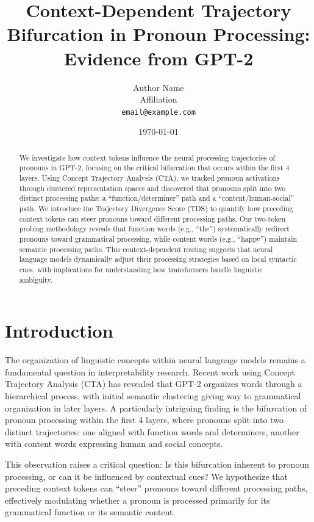 \documentclass[11pt]{article}
\title{Context-Dependent Trajectory Bifurcation in Pronoun Processing: Evidence from GPT-2}
\author{
  Author Name \\
  Affiliation \\
  \texttt{email@example.com}
}
\date{\today}
\begin{document}
\maketitle

\begin{abstract}
We investigate how context tokens influence the neural processing trajectories of pronouns in GPT-2, focusing on the critical bifurcation that occurs within the first 4 layers. Using Concept Trajectory Analysis (CTA), we tracked pronoun activations through clustered representation spaces and discovered that pronouns split into two distinct processing paths: a ``function/determiner'' path and a ``content/human-social'' path. We introduce the Trajectory Divergence Score (TDS) to quantify how preceding context tokens can steer pronouns toward different processing paths. Our two-token probing methodology reveals that function words (e.g., ``the'') systematically redirect pronouns toward grammatical processing, while content words (e.g., ``happy'') maintain semantic processing paths. This context-dependent routing suggests that neural language models dynamically adjust their processing strategies based on local syntactic cues, with implications for understanding how transformers handle linguistic ambiguity.
\end{abstract}

\section{Introduction}

The organization of linguistic concepts within neural language models remains a fundamental question in interpretability research. Recent work using Concept Trajectory Analysis (CTA) has revealed that GPT-2 organizes words through a hierarchical process, with initial semantic clustering giving way to grammatical organization in later layers. A particularly intriguing finding is the bifurcation of pronoun processing within the first 4 layers, where pronouns split into two distinct trajectories: one aligned with function words and determiners, another with content words expressing human and social concepts.

This observation raises a critical question: Is this bifurcation inherent to pronoun processing, or can it be influenced by contextual cues? We hypothesize that preceding context tokens can ``steer'' pronouns toward different processing paths, effectively modulating whether a pronoun is processed primarily for its grammatical function or its semantic content.
\end{document}

